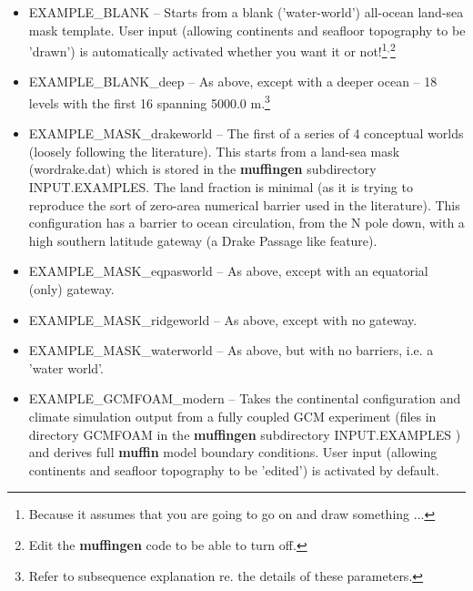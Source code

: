 \documentclass[11pt,fleqn]{book} %
\begin{document}
\vspace{1mm}
\begin{itemize}[noitemsep]

\vspace{1mm}
\item \textsf{\footnotesize EXAMPLE\_BLANK} -- Starts from a blank ('water-world') all-ocean land-sea mask template. User input (allowing continents and seafloor topography to be 'drawn') is automatically activated whether you want it or not!\footnote{Because it assumes that you are going to go on and draw something ...}\(^{,}\)\footnote{Edit the \textbf{muffingen} code to be able to turn off.}

\vspace{1mm}
\item \textsf{\footnotesize EXAMPLE\_BLANK\_deep} -- As above, except with a deeper ocean -- 18 levels with the first 16 spanning 5000.0 m.\footnote{Refer to subsequence explanation re. the details of these parameters.}

\vspace{1mm}
\item \textsf{\footnotesize EXAMPLE\_MASK\_drakeworld} -- The first of a series of 4 conceptual worlds (loosely following the literature). This starts from a land-sea mask (\footnotesize\textsf{wordrake.dat}\normalsize) which is stored in the \textbf{muffingen} subdirectory \footnotesize\textsf{INPUT.EXAMPLES}\normalsize. The land fraction is minimal (as it is trying to reproduce the sort of zero-area numerical barrier used in the literature). This configuration has a barrier to ocean circulation, from the N pole down, with a high southern latitude gateway (a Drake Passage like feature).

\vspace{1mm}
\item \textsf{\footnotesize EXAMPLE\_MASK\_eqpasworld} -- As above, except with an equatorial (only) gateway.

\vspace{1mm}
\item \textsf{\footnotesize EXAMPLE\_MASK\_ridgeworld} -- As above, except with no gateway.

\vspace{1mm}
\item \textsf{\footnotesize EXAMPLE\_MASK\_waterworld} -- As above, but with no barriers, i.e. a 'water world'.

\vspace{1mm}
\item \textsf{\footnotesize EXAMPLE\_GCMFOAM\_modern} -- Takes the continental configuration and climate simulation output from a fully coupled GCM experiment (files in directory \footnotesize\textsf{GCMFOAM }\normalsize in the \textbf{muffingen} subdirectory \footnotesize\textsf{INPUT.EXAMPLES }\normalsize) and derives full \textbf{muffin} model boundary conditions. User input (allowing continents and seafloor topography to be 'edited') is activated by default.


\end{itemize}
\end{document}
